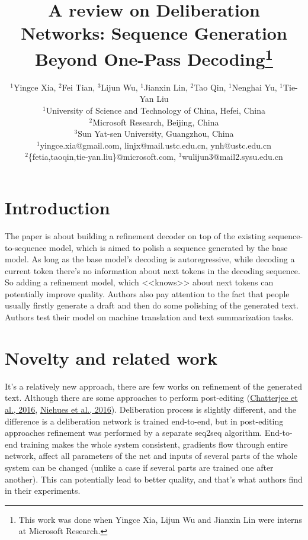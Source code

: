 \documentclass{article}
\title{A review on Deliberation Networks: Sequence Generation
Beyond One-Pass Decoding\thanks{This work was done when Yingce Xia, Lijun Wu and Jianxin Lin were interns at Microsoft Research.
}}
\author{
  $^{1}$Yingce Xia, $^{2}$Fei Tian, $^{3}$Lijun Wu, $^{1}$Jianxin Lin, $^{2}$Tao Qin, $^{1}$Nenghai Yu, $^{1}$Tie-Yan Liu \\
  $^{1}$University of Science and Technology of China, Hefei, China \\
  $^{2}$Microsoft Research, Beijing, China \\
  $^{3}$Sun Yat-sen University, Guangzhou, China \\
  $^{1}$yingce.xia@gmail.com, linjx@mail.ustc.edu.cn, ynh@ustc.edu.cn \\
  $^{2}$\{fetia,taoqin,tie-yan.liu\}@microsoft.com, $^{3}$wulijun3@mail2.sysu.edu.cn
}
\begin{document}

\maketitle


\section{Introduction}
The paper is about building a refinement decoder on top of the existing sequence-to-sequence model, which is aimed to polish a sequence generated by the base model. As long as the base model's decoding is autoregressive, while decoding a current token there's no information about next tokens in the decoding sequence. So adding a refinement model, which <<knows>> about next tokens can potentially improve quality. Authors also pay attention to the fact that people usually firstly generate a draft and then do some polishing of the generated text. Authors test their model on machine translation and text summarization tasks.

\section{Novelty and related work}
It's a relatively new approach, there are few works on refinement of the generated text. Although there are some approaches to perform post-editing (\hyperref[itm:post_editing_shared_text]{Chatterjee et al., 2016}, \hyperref[itm:pre_translation]{Niehues et al., 2016}). Deliberation process is slightly different, and the difference is a deliberation network is trained end-to-end, but in post-editing approaches refinement was performed by a separate seq2seq algorithm. End-to-end training makes the whole system consistent, gradients flow through entire network, affect all parameters of the net and inputs of several parts of the whole system can be changed (unlike a case if several parts are trained one after another). This can potentially lead to better quality, and that's what authors find in their experiments.
\end{document}
